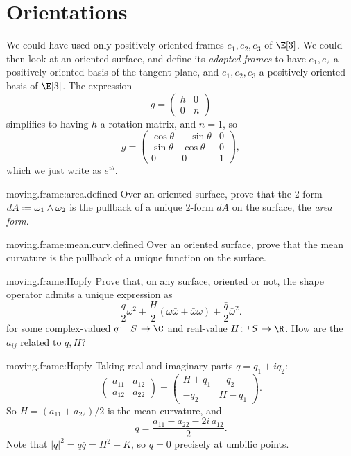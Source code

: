 \section{Orientations}
We could have used only positively oriented frames \(e_1,e_2,e_3\) of \(\E[3]\).
We could then look at an oriented surface, and define its \emph{adapted frames} to have \(e_1,e_2\) a positively oriented basis of the tangent plane, and \(e_1,e_2,e_3\) a positively oriented basis of \(\E[3]\).
The expression 
\[
g=
\begin{pmatrix}
h & 0 \\
0 & n
\end{pmatrix}
\]
simplifies to having \(h\) a rotation matrix, and \(n=1\), so
\[
g=
\begin{pmatrix}
\cos \theta & -\sin \theta & 0 \\
\sin \theta & \cos \theta & 0 \\
0 & 0 & 1
\end{pmatrix},
\]
which we just write as \(e^{i\theta}\).
\begin{problem}{moving.frame:area.defined}
Over an oriented surface, prove that the \(2\)-form \(dA\defeq\omega_1\wedge\omega_2\) is the pullback of a unique \(2\)-form \(dA\) on the surface, the \emph{area form}.
\end{problem}
\begin{problem}{moving.frame:mean.curv.defined}
Over an oriented surface, prove that the mean curvature is the pullback of a unique function on the surface.
\end{problem}
\begin{problem}{moving.frame:Hopfy}
Prove that, on any surface, oriented or not, the shape operator admits a unique expression as 
\[
\frac{q}{2} \omega^2 + \frac{H}{2} (\omega \bar\omega + \bar\omega\omega) + \frac{\bar{q}}{2} \bar\omega^2.
\]
for some complex-valued \(q \colon \frameBundle{S} \to \C\) and real-value \(H \colon \frameBundle{S} \to \R\).
How are the \(a_{ij}\) related to \(q,H\)?
\end{problem}
\begin{answer}{moving.frame:Hopfy}
Taking real and imaginary parts \(q=q_1+iq_2\):
\[
\begin{pmatrix}
a_{11} & a_{12} \\
a_{12} & a_{22}
\end{pmatrix}
=
\begin{pmatrix}
H+q_1 & -q_2 \\
-q_2 & H-q_1
\end{pmatrix}.
\]
So \(H=(a_{11}+a_{22})/2\) is the mean curvature, and
\[
q=\frac{a_{11}-a_{22}-2i\, a_{12}}{2}.
\]
Note that \(|q|^2=q\bar{q}=H^2-K\), so \(q=0\) precisely at umbilic points.
\end{answer}
